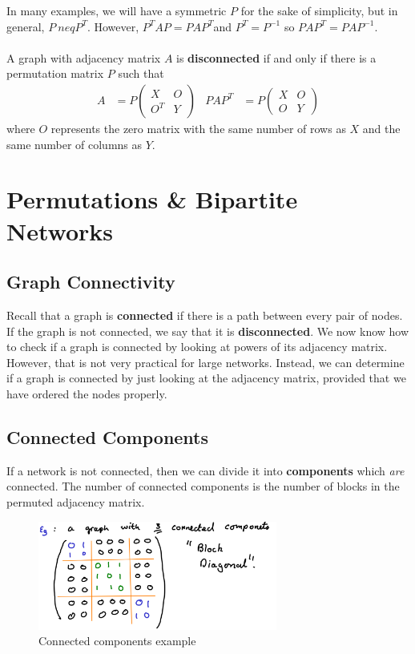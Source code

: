 \documentclass[a4paper,11pt]{article}
\begin{document}
In many examples, we will have a symmetric $P$ for the sake of simplicity, but in general, $P \ neq P^T$.
However, $P^TAP = PAP^T$and $P^T = P^{-1}$ so $PAP^T = PAP^{-1}$.
\\\\
A graph with adjacency matrix $A$ is \textbf{disconnected} if and only if there is a permutation matrix $P$ such that
\begin{align*}
A &= P \begin{pmatrix} X & O \\ O^T & Y \end{pmatrix} &
PAP^T &= P \begin{pmatrix} X & O \\ O & Y \end{pmatrix}
\end{align*}
where $O$ represents the zero matrix with the same number of rows as $X$ and the same number of columns as $Y$.

\section{Permutations \& Bipartite Networks}
\subsection{Graph Connectivity}
Recall that a graph is \textbf{connected} if there is a path between every pair of nodes.
If the graph is not connected, we say that it is \textbf{disconnected}.
We now know how to check if a graph is connected by looking at powers of its adjacency matrix.
However, that is not very practical for large networks.
Instead, we can determine if a graph is connected by just looking at the adjacency matrix, provided that we have ordered the nodes properly.

\subsection{Connected Components}
If a network is not connected, then we can divide it into \textbf{components} which \textit{are} connected.
The number of connected components is the number of blocks in the permuted adjacency matrix.

\begin{figure}[H]
    \centering
    \includegraphics[width=0.7\textwidth]{./images/connectedcomponents.png}
    \caption{ Connected components example }
\end{figure}
\end{document}
